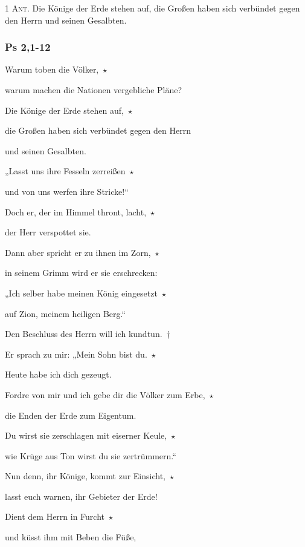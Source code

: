 \noindent \textsc{1 Ant.} Die Könige der Erde stehen auf, die Großen haben sich verbündet gegen den Herrn und seinen Gesalbten.

\subsubsection{Ps 2,1-12}

\noindent Warum toben die Völker,~$\star$~\nopagebreak

warum machen die Nationen vergebliche Pläne?
 
\noindent Die Könige der Erde stehen auf,~$\star$~\nopagebreak

die Großen haben sich verbündet gegen den Herrn 

und seinen Gesalbten.
 
\noindent „Lasst uns ihre Fesseln zerreißen~$\star$~\nopagebreak

und von uns werfen ihre Stricke!“
 
\noindent Doch er, der im Himmel thront, lacht,~$\star$~\nopagebreak

der Herr verspottet sie.
 
\noindent Dann aber spricht er zu ihnen im Zorn,~$\star$~\nopagebreak

in seinem Grimm wird er sie erschrecken:
 
\noindent „Ich selber habe meinen König eingesetzt~$\star$~\nopagebreak

auf Zion, meinem heiligen Berg.“
 
\noindent Den Beschluss des Herrn will ich kundtun.~†~\nopagebreak

Er sprach zu mir: „Mein Sohn bist du.~$\star$~\nopagebreak

Heute habe ich dich gezeugt.
 
\noindent Fordre von mir und ich gebe dir die Völker zum Erbe,~$\star$~\nopagebreak

die Enden der Erde zum Eigentum.
 
\noindent Du wirst sie zerschlagen mit eiserner Keule,~$\star$~\nopagebreak

wie Krüge aus Ton wirst du sie zertrümmern.“
 
\noindent Nun denn, ihr Könige, kommt zur Einsicht,~$\star$~\nopagebreak

lasst euch warnen, ihr Gebieter der Erde!
 
\noindent Dient dem Herrn in Furcht~$\star$~\nopagebreak

und küsst ihm mit Beben die Füße,
 
